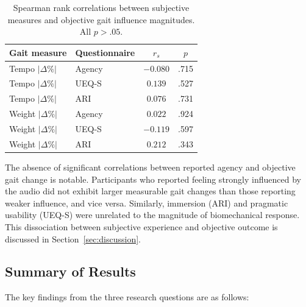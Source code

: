 \begin{table}[ht]
\centering
\caption{Spearman rank correlations between subjective measures and objective
         gait influence magnitudes. All $p > .05$.}
\label{tab:correlations}
\begin{tabular}{llcc}
\hline
\textbf{Gait measure} & \textbf{Questionnaire} & \boldmath$r_s$ & \boldmath$p$ \\
\hline
Tempo $|\Delta\%|$  & Agency      & $-0.080$ & .715 \\
Tempo $|\Delta\%|$  & UEQ-S       &  $0.139$ & .527 \\
Tempo $|\Delta\%|$  & ARI         &  $0.076$ & .731 \\
Weight $|\Delta\%|$ & Agency      &  $0.022$ & .924 \\
Weight $|\Delta\%|$ & UEQ-S       & $-0.119$ & .597 \\
Weight $|\Delta\%|$ & ARI         &  $0.212$ & .343 \\
\hline
\end{tabular}
\end{table}

The absence of significant correlations between reported agency and objective
gait change is notable. Participants who reported feeling strongly influenced by
the audio did not exhibit larger measurable gait changes than those reporting
weaker influence, and vice versa. Similarly, immersion (ARI) and pragmatic
usability (UEQ-S) were unrelated to the magnitude of biomechanical response.
This dissociation between subjective experience and objective outcome is
discussed in Section~\ref{sec:discussion}.

\subsection{Summary of Results}
\label{sec:results:summary}

The key findings from the three research questions are as follows:

